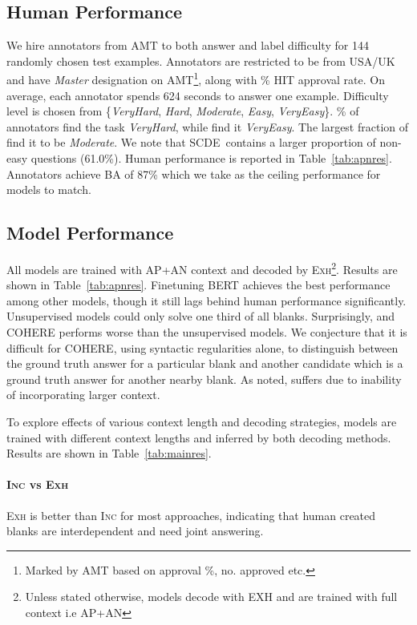 \documentclass[11pt,a4paper]{article}
\newcommand{\dsname}{\textsc{SCDE}}
\begin{document}
\subsection{Human Performance}
We hire annotators from AMT to both answer and label difficulty for 144 randomly chosen test examples. Annotators are restricted to be from USA/UK and have \emph{Master} designation on AMT\footnote{Marked by AMT based on approval \%, no. approved etc.}, along with  \% HIT approval rate. 
On average, each annotator spends 624 seconds to answer one example. Difficulty level is chosen from \{\textit{VeryHard}, \textit{Hard}, \textit{Moderate}, \textit{Easy}, \textit{VeryEasy}\}. \% of annotators find the task \textit{VeryHard}, while  find it \textit{VeryEasy}. The largest fraction of  find it to be \textit{Moderate}. We note that \dsname~contains a larger proportion of non-easy questions (61.0\%). Human performance is reported in Table~\ref{tab:apnres}. Annotators achieve BA of 87\%
which we take as the ceiling performance for models to match. 

\subsection{Model Performance}
All models are trained with AP+AN context and decoded by \textsc{Exh}\footnote{Unless stated otherwise, models decode with EXH and are trained with full context i.e AP+AN}. Results are shown in Table~\ref{tab:apnres}. Finetuning BERT achieves the best performance among other models, though it still lags behind human performance significantly. Unsupervised models could only solve one third of all blanks. Surprisingly,  and \textsc{COHERE} performs worse than the unsupervised models.  We conjecture that it is difficult for COHERE, using syntactic regularities alone, to distinguish between the ground truth answer for a particular blank and another candidate which is a ground truth answer for another nearby blank. As noted,  suffers due to inability of incorporating larger context.

\label{sec:model_experiments}
To explore effects of various context length and decoding strategies, models are trained with different context lengths and inferred by both decoding methods. Results are shown in Table~\ref{tab:mainres}.
\paragraph{\textsc{Inc} vs \textsc{Exh}} \textsc{Exh} is better than \textsc{Inc} for most approaches, indicating that human created blanks are interdependent and need joint answering. 
\end{document}
